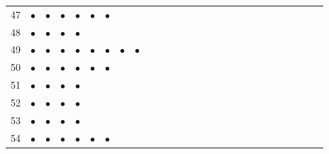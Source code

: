 \documentclass[text.tex]{subfiles}
\begin{document}
\begin{table}
{\begin{tabular}{l|cccccccccccccccccccccccccc}
47  & $\bullet$ & $\bullet$ & $\bullet$ & $\bullet$ & $\bullet$ & $\bullet$ &           &           &           &           &           &           &           &           &           &           &           &           &           &           &           &           &           &           &           \\ 
48  & $\bullet$ & $\bullet$ & $\bullet$ & $\bullet$ &           &           &           &           &           &           &           &           &           &           &           &           &           &           &           &           &           &           &           &           &           \\
49  & $\bullet$ & $\bullet$ & $\bullet$ & $\bullet$ & $\bullet$ & $\bullet$ & $\bullet$ & $\bullet$ &           &           &           &           &           &           &           &           &           &           &           &           &           &           &           &           &           \\ 
50  & $\bullet$ & $\bullet$ & $\bullet$ & $\bullet$ & $\bullet$ & $\bullet$ &           &           &           &           &           &           &           &           &           &           &           &           &           &           &           &           &           &           &           \\
51  & $\bullet$ & $\bullet$ & $\bullet$ & $\bullet$ &           &           &           &           &           &           &           &           &           &           &           &           &           &           &           &           &           &           &           &           &           \\
52  & $\bullet$ & $\bullet$ & $\bullet$ & $\bullet$ &           &           &           &           &           &           &           &           &           &           &           &           &           &           &           &           &           &           &           &           &           \\
53  & $\bullet$ & $\bullet$ & $\bullet$ & $\bullet$ &           &           &           &           &           &           &           &           &           &           &           &           &           &           &           &           &           &           &           &           &           \\
54  & $\bullet$ & $\bullet$ & $\bullet$ & $\bullet$ & $\bullet$ & $\bullet$ &           &           &           &           &           &           &           &           &           &           &           &           &           &           &           &           &           &           &           \\

\end{tabular}}
\end{table}
\end{document}
